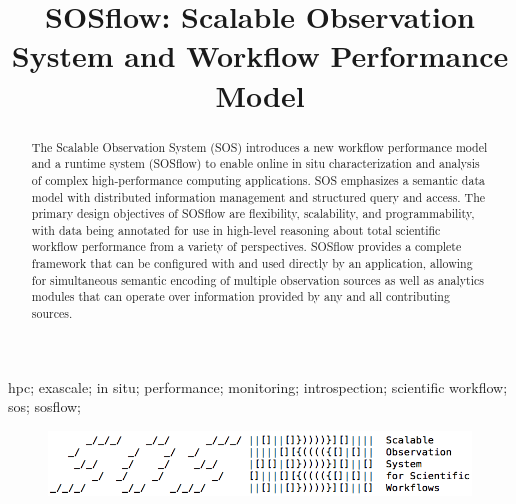 
\title{SOSflow: Scalable Observation System and Workflow Performance Model}

\author{
\IEEEauthorblockA{Department of Computer and Information Science\\
                  University of Oregon\\ Eugene, OR United States\\
                  Email: cdw@cs.uoregon.edu} }
\maketitle


\begin{abstract}
The Scalable Observation System (SOS) introduces a new workflow
performance model and a runtime system (SOSflow) to enable online in
situ characterization and analysis of complex high-performance
computing applications.
%
SOS emphasizes a semantic data model with distributed information
management and structured query and access.
%
The primary design objectives of SOSflow are flexibility, scalability,
and programmability, with data being annotated for use in high-level
reasoning about total scientific workflow performance from a variety
of perspectives.
%
SOSflow provides a complete framework that can be configured with and
used directly by an application, allowing for simultaneous semantic
encoding of multiple observation sources as well as analytics modules
that can operate over information provided by any and all contributing
sources.
\end{abstract}


\begin{IEEEkeywords}
hpc; exascale; in situ; performance; monitoring; introspection;
scientific workflow; sos; sosflow;
\end{IEEEkeywords}


\IEEEpeerreviewmaketitle


\begin{figure}[!t]
\centering
\includegraphics[width=5in]{images/sosflow_masthead.png}
\label{fig_sim}
\end{figure}



